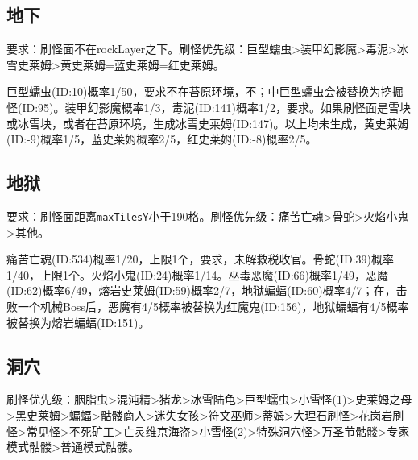 \subsection{地下}
要求：刷怪面不在rockLayer之下。刷怪优先级：巨型蠕虫>装甲幻影魔>毒泥>冰雪史莱姆>黄史莱姆=蓝史莱姆=红史莱姆。

巨型蠕虫(ID:10)概率1/50，要求不在苔原环境，不；中巨型蠕虫会被替换为挖掘怪(ID:95)。装甲幻影魔概率1/3，毒泥(ID:141)概率1/2，要求。如果刷怪面是雪块或冰雪块，或者在苔原环境，生成冰雪史莱姆(ID:147)。以上均未生成，黄史莱姆(ID:-9)概率1/5，蓝史莱姆概率2/5，红史莱姆(ID:-8)概率2/5。

\subsection{地狱}
要求：刷怪面距离\lstinline{maxTilesY}小于190格。刷怪优先级：痛苦亡魂>骨蛇>火焰小鬼>其他。

痛苦亡魂(ID:534)概率1/20，上限1个，要求，未解救税收官。骨蛇(ID:39)概率1/40，上限1个。火焰小鬼(ID:24)概率1/14。巫毒恶魔(ID:66)概率1/49，恶魔(ID:62)概率6/49，熔岩史莱姆(ID:59)概率2/7，地狱蝙蝠(ID:60)概率4/7；在，击败一个机械Boss后，恶魔有4/5概率被替换为红魔鬼(ID:156)，地狱蝙蝠有4/5概率被替换为熔岩蝙蝠(ID:151)。

\subsection{洞穴}
刷怪优先级：胭脂虫>混沌精>猪龙>冰雪陆龟>巨型蠕虫>小雪怪(1)>史莱姆之母>黑史莱姆>蝙蝠>骷髅商人>迷失女孩>符文巫师>蒂姆>大理石刷怪>花岗岩刷怪>常见怪>不死矿工>亡灵维京海盗>小雪怪(2)>特殊洞穴怪>万圣节骷髅>专家模式骷髅>普通模式骷髅。

